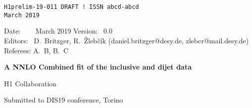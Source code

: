 \documentclass[12pt]{article}
\begin{document}
\begin{titlepage}
\noindent
\begin{flushleft}
{\tt H1prelim-19-011 DRAFT ! \hfill    ISSN abcd-abcd} \\
{\tt March 2019}                  \\
\end{flushleft}

\noindent
Date:   ~   \ \ March 2019 %
Version:~   0.0 \\
Editors:~   D.~Britzger, R.~\v{Z}leb\v{c}\'{i}k (daniel.britzger@desy.de, zlebcr@mail.desy.de) \\
Referees:  A.~B, B.~C \\
\noindent

\vspace{1cm}
\begin{center}
\begin{Large}

{\bf
   A NNLO Combined fit of the inclusive and dijet data

}

\vspace{1.5cm}

H1 Collaboration%

\end{Large}
\end{center}

\vspace{1.5cm}


\begin{abstract}
\noindent
A new combined fit of diffractive parton distribution functions (DPDFs) to the HERA inclusive and jet data in diffractive deep-inelastic scattering (DDIS) at next-to-next-to-leading order accuracy (NNLO) is presented.
The inclusion of the most comprehensive dijet cross section data, together with their NNLO predictions, provide enhanced constraints to the gluon component of the DPDF, which is of particular importance for diffractive PDFs.
Compared to the previous HERA fits, the presented fit includes the high-precision HERA-II data, which represents 40times higher luminosity for inclusive sample and 6times higher luminosity for the jet sample.
In addition to the inclusive DDIS sample at the nominal centre-of-mass energy $\sqrt{s}=319$, also the inclusive data at 252, 225 GeV are included into the fit.
The extracted DPDFs are compared to the alternative existing DPDFs, and are used to predict cross sections for large number of the available jet measurements and different observables.
\noindent
\end{abstract}


\begin{center} Submitted to DIS19 conference, Torino \end{center}

\end{titlepage}
\end{document}
